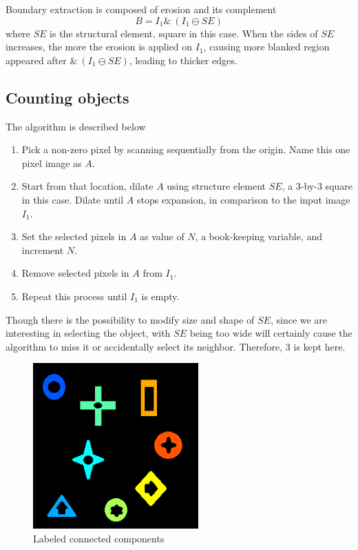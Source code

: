 \documentclass[12pt]{article}
\begin{document}
Boundary extraction is composed of erosion and its complement
\begin{equation}
	B = I_1 \& ~(I_1 \ominus SE)
\end{equation}
where $SE$ is the structural element, square in this case.
When the sides of $SE$ increases, the more the erosion is applied on $I_1$, causing more blanked region appeared after $\& ~(I_1 \ominus SE)$, leading to thicker edges.

\subsection*{Counting objects}
The algorithm is described below 
\begin{enumerate}
\item 
Pick a non-zero pixel by scanning sequentially from the origin. Name this one pixel image as $A$. 

\item
Start from that location, dilate $A$ using structure element $SE$, a 3-by-3 square in this case.
Dilate until $A$ stops expansion, in comparison to the input image $I_1$.

\item 
Set the selected pixels in $A$ as value of $N$, a book-keeping variable, and increment $N$.

\item
Remove selected pixels in $A$ from $I_1$.

\item
Repeat this process until $I_1$ is empty.
\end{enumerate}
Though there is the possibility to modify size and shape of $SE$, since we are interesting in selecting the object, with $SE$ being too wide will certainly cause the algorithm to miss it or accidentally select its neighbor. Therefore, 3 is kept here.

\begin{figure}[H]
    \centering
    \includegraphics[height=2.5in]{images/L}
    \caption{Labeled connected components}
\end{figure}
\end{document}

